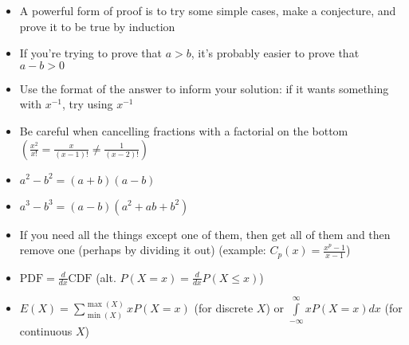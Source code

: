 \documentclass[../main.tex]{subfile}
\begin{document}

\begin{itemize}
	\item A powerful form of proof is to try some simple cases, make a conjecture, and prove it to be true by induction
	\item If you're trying to prove that $a > b$, it's probably easier to prove that $a - b > 0$
	\item Use the format of the answer to inform your solution: if it wants something with $x^{-1}$, try using $x^{-1}$
\end{itemize}


\begin{itemize}
	\item Be careful when cancelling fractions with a factorial on the bottom $\displaystyle \left(\frac{x^2}{x!} = \frac{x}{(x - 1)!} \ne \frac{1}{(x - 2)!}\right)$
	\item $a^2 - b^2 = (a + b)(a - b)$
	\item $a^3 - b^3 = (a - b)(a^2 + ab + b^2)$
	\item If you need all the things except one of them, then get all of them and then remove one (perhaps by dividing it out) (example: $C_p(x) = \frac{x^p - 1}{x - 1}$)
\end{itemize}


\begin{itemize}
	\item $\text{PDF} = \frac{d}{dx} \text{CDF}$ (alt. $P(X = x) = \frac{d}{dx} P(X \le x)$)
	\item $E(X) = \sum\limits_{\min(X)}^{\max(X)} x P(X = x)$ (for discrete $X$) or $\int\limits_{-\infty}^{\infty} x P(X = x) dx$ (for continuous $X$)
\end{itemize}
\end{document}
